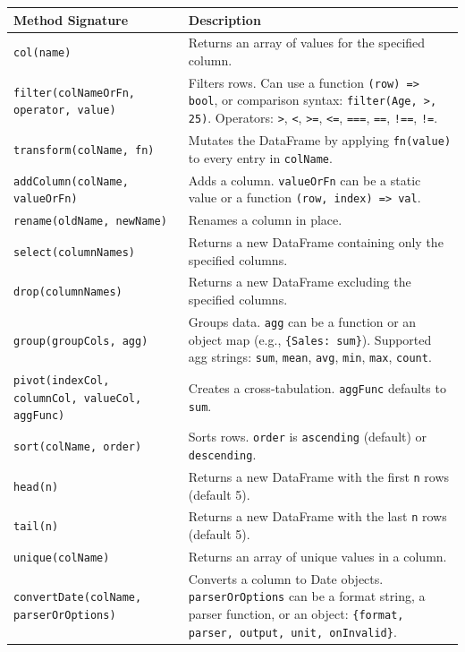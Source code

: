 \documentclass[10pt, a4paper]{article}
\begin{document}
\begin{longtable}{p{6cm} p{9cm}}
\toprule
\textbf{Method Signature} & \textbf{Description} \\
\midrule
\texttt{col(name)} & Returns an array of values for the specified column. \\
\midrule
\texttt{filter(colNameOrFn, operator, value)} & Filters rows. Can use a function \texttt{(row) => bool}, or comparison syntax: \texttt{filter(Age, >, 25)}. Operators: \texttt{>}, \texttt{<}, \texttt{>=}, \texttt{<=}, \texttt{===}, \texttt{==}, \texttt{!==}, \texttt{!=}. \\
\midrule
\texttt{transform(colName, fn)} & Mutates the DataFrame by applying \texttt{fn(value)} to every entry in \texttt{colName}. \\
\midrule
\texttt{addColumn(colName, valueOrFn)} & Adds a column. \texttt{valueOrFn} can be a static value or a function \texttt{(row, index) => val}. \\
\midrule
\texttt{rename(oldName, newName)} & Renames a column in place. \\
\midrule
\texttt{select(columnNames)} & Returns a new DataFrame containing only the specified columns. \\
\midrule
\texttt{drop(columnNames)} & Returns a new DataFrame excluding the specified columns. \\
\midrule
\texttt{group(groupCols, agg)} & Groups data. \texttt{agg} can be a function or an object map (e.g., \texttt{\{Sales: sum\}}). Supported agg strings: \texttt{sum}, \texttt{mean}, \texttt{avg}, \texttt{min}, \texttt{max}, \texttt{count}. \\
\midrule
\texttt{pivot(indexCol, columnCol, valueCol, aggFunc)} & Creates a cross-tabulation. \texttt{aggFunc} defaults to \texttt{sum}. \\
\midrule
\texttt{sort(colName, order)} & Sorts rows. \texttt{order} is \texttt{ascending} (default) or \texttt{descending}. \\
\midrule
\texttt{head(n)} & Returns a new DataFrame with the first \texttt{n} rows (default 5). \\
\midrule
\texttt{tail(n)} & Returns a new DataFrame with the last \texttt{n} rows (default 5). \\
\midrule
\texttt{unique(colName)} & Returns an array of unique values in a column. \\
\midrule
\texttt{convertDate(colName, parserOrOptions)} & Converts a column to Date objects. \texttt{parserOrOptions} can be a format string, a parser function, or an object: \texttt{\{format, parser, output, unit, onInvalid\}}. \\
\bottomrule
\end{longtable}
\end{document}
